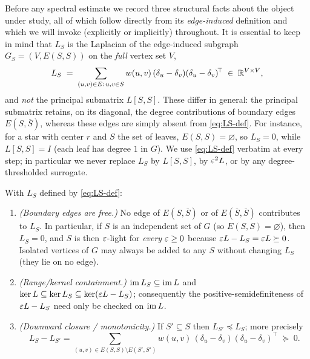 Before any spectral estimate we record three structural facts about the object
under study, all of which follow directly from its \emph{edge-induced}
definition and which we will invoke (explicitly or implicitly) throughout. It is
essential to keep in mind that $L_S$ is the Laplacian of the edge-induced
subgraph $G_S=(V,E(S,S))$ on the \emph{full} vertex set $V$,
\begin{equation}\label{eq:LS-def}
  L_S \;=\; \sum_{(u,v)\in E:\,u,v\in S} w(u,v)\,(\delta_u-\delta_v)(\delta_u-\delta_v)^{\!\top}
        \;\in\;\mathbb{R}^{V\times V},
\end{equation}
and \emph{not} the principal submatrix $L[S,S]$. These differ in general: the
principal submatrix retains, on its diagonal, the degree contributions of
boundary edges $E(S,\overline S)$, whereas these edges are simply absent from
\eqref{eq:LS-def}. For instance, for a star with center $r$ and $S$ the set of
leaves, $E(S,S)=\varnothing$, so $L_S=0$, while $L[S,S]=I$ (each leaf has degree
$1$ in $G$). We use \eqref{eq:LS-def} verbatim at every step; in particular we
never replace $L_S$ by $L[S,S]$, by $\varepsilon^2 L$, or by any degree-thresholded
surrogate.

\begin{qsixproposition}\label{prop:struct}
With $L_S$ defined by \eqref{eq:LS-def}:
\begin{enumerate}
\item[\textup{(i)}] \emph{(Boundary edges are free.)} No edge of $E(S,\overline S)$
or of $E(\overline S,\overline S)$ contributes to $L_S$. In particular, if $S$ is
an independent set of $G$ \textup{(}so $E(S,S)=\varnothing$\textup{)}, then
$L_S=0$, and $S$ is then $\varepsilon$-light for \emph{every} $\varepsilon\ge0$ because
$\varepsilon L-L_S=\varepsilon L\succeq0$. Isolated vertices of $G$ may always be added
to any $S$ without changing $L_S$ \textup{(}they lie on no edge\textup{)}.
\item[\textup{(ii)}] \emph{(Range/kernel containment.)} $\operatorname{im} L_S\subseteq\operatorname{im} L$
and $\ker L\subseteq\ker L_S\subseteq\ker(\varepsilon L-L_S)$; consequently the
positive-semidefiniteness of $\varepsilon L-L_S$ need only be checked on $\operatorname{im} L$.
\item[\textup{(iii)}] \emph{(Downward closure / monotonicity.)} If $S'\subseteq S$
then $L_{S'}\preceq L_S$; more precisely
\[
  L_S-L_{S'}=\sum_{(u,v)\in E(S,S)\setminus E(S',S')}w(u,v)\,(\delta_u-\delta_v)(\delta_u-\delta_v)^{\!\top}\;\succeq\;0 .
\]
\end{enumerate}
\end{qsixproposition}

